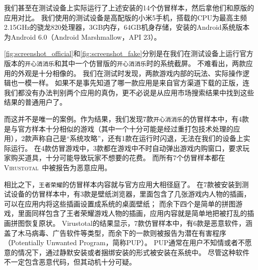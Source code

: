 我们甚至在测试设备上实际运行了上述安装的14个仿冒样本，然后拿他们和原版的应用对比。
我们使用的测试设备是高配版的小米5手机，搭载的CPU为最高主频2.15GHz的骁龙820处理器，3GB内存，64GB机身存储，安装的Android系统版本为Android 6.0（Android Marshmallow，API 23）。

\autoref{fig:screenshot_official}和\autoref{fig:screenshot_fake}分别是在我们在测试设备上运行官方版本的\texttt{开心消消乐}和其中一个仿冒版的\texttt{开心消消乐}时的系统截屏。
不难看出，两款应用的外观是十分相像的。
我们在测试时发现，两款游戏内部的玩法、实际操作逻辑也一模一样。
如果不是事先知道了哪一款应用是来自官方渠道下载的正版，连我们都没有办法判别两个应用的真伪，更不必说是从应用市场搜索结果中找到这些结果的普通用户了。

而这并不是唯一的案例。作为结果，我们发现7款\texttt{开心消消乐}的仿冒样本中，有4款是与官方样本十分相似的游戏（其中一个十分可能是经过重打包技术处理的应用），2款声称自己是``系统攻略''，还有1款在运行时闪退，无法在我们的设备上实际运行。
在4款仿冒游戏中，3款都在游戏中不时自动弹出游戏内购窗口，要求玩家购买道具，十分可能导致玩家不想要的花费。
而所有7个仿冒样本都在\textsc{Virustotal}~\cite{virustotal}中被报告为恶意应用。

相比之下，\texttt{王者荣耀}的仿冒样本内容就与官方应用大相径庭了。
在7款被安装到测试设备的仿冒样本中，有3款是壁纸浏览器，里面包含了几张游戏内人物的插画，可以在应用内将这些插画设置成系统的桌面壁纸；
而余下四个是简单的拼图游戏，里面同样包含了王者荣耀游戏人物的插画，应用内容就是简单地把被打乱的插画拼图恢复原状。
Virustotal的结果显示，7款仿冒样本中，有6款是恶意软件，涵盖了木马病毒、广告软件等类型，而余下的一款则被报告为潜在有害程序（Potentially Unwanted Program，简称PUP）。
PUP通常在用户不知情或者不愿意的情况下，通过静默安装或者捆绑安装的形式被安装在系统中。
尽管这种软件不一定包含恶意代码，但其动机十分可疑。


